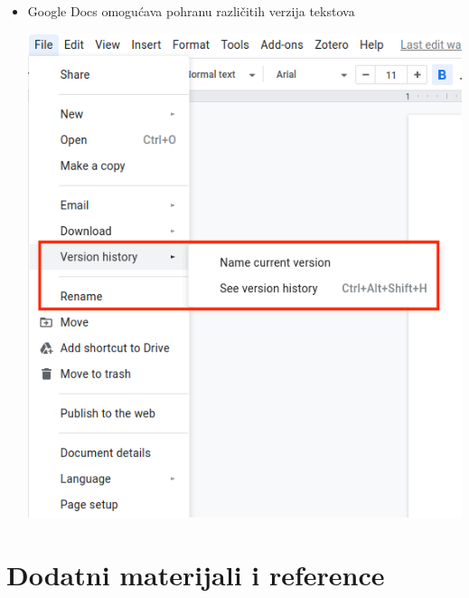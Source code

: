 \documentclass[aspectratio=169]{beamer}
\begin{document}
\begin{frame}
    \begin{itemize}
        \item Google Docs omogućava pohranu različitih verzija tekstova
            
        \vspace{1em}

        \begin{center}
            \includegraphics[scale=.25]{images/docs-vcs.png}
        \end{center}
    \end{itemize}
\end{frame}

\section{Dodatni materijali i reference}
\end{document}
